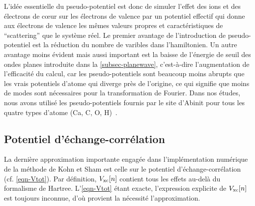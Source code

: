 L'idée essentielle du pseudo-potentiel est donc de simuler l'effet des ions et des électrons de cœur
sur les électrons de valence par un potentiel effectif qui donne aux électrons de valence
les mêmes valeurs propres et caractéristiques de ``scattering'' que le système réel.
Le premier avantage de l'introduction de pseudo-potentiel est la réduction du nombre de varibles dans l'hamiltonien.
Un autre avantage moins évident mais aussi important est la baisse de l'énergie de seuil des ondes planes introduite dans la \cref{subsec-planewave},
c'est-à-dire l'augmentation de l'efficacité du calcul, car les pseudo-potentiels sont beaucoup moins abrupts
que les vrais potentiels d'atome qui diverge près de l'origine,
ce qui signifie que moins de modes sont nécessaires pour la transformation de Fourier.
Dans nos études, nous avons utilisé les pseudo-potentiels fournis par le site d'Abinit pour tous les
quatre types d'atome (Ca, C, O, H)~\cite{Pseudo}.

\subsection{Potentiel d'échange-corrélation}
\label{subsec-xc}
La dernière approximation importante engagée dans l'implémentation numérique
de la méthode de Kohn et Sham est celle sur le potentiel d'échange-corrélation (cf. \cref{eqn-Vtot}).
Par définition, $V_{\textnormal{xc}}[n]$ contient tous les effets au-delà du formalisme de Hartree.
L'\cref{eqn-Vtot} étant exacte, l'expression explicite de $V_{\textnormal{xc}}[n]$ est toujours inconnue,
d'où provient la nécessité l'approximation.

